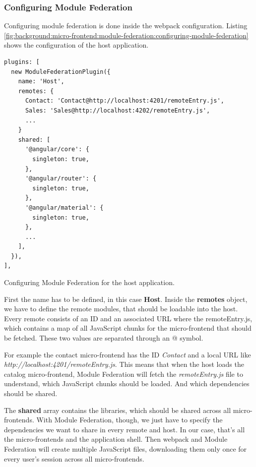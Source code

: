 \subsubsection{Configuring Module Federation}\label{subsubsection:background:micro-frontend:module-federation:configuring-module-federation}

Configuring module federation is done inside the webpack configuration. Listing \ref{fig:background:micro-frontend:module-federation:configuring-module-federation} shows the configuration of the host application.

\ifshowListings
\begin{listing}[H]
    \begin{verbatim}
plugins: [
  new ModuleFederationPlugin({
    name: 'Host',
    remotes: {
      Contact: 'Contact@http://localhost:4201/remoteEntry.js',
      Sales: 'Sales@http://localhost:4202/remoteEntry.js',
      ...
    }
    shared: [
      '@angular/core': {
        singleton: true,
      },
      '@angular/router': {
        singleton: true,
      },
      '@angular/material': {
        singleton: true,
      },
      ...
    ],
  }),
],
    \end{verbatim}
    \caption{Configuring Module Federation for the host application.}\label{fig:background:micro-frontend:module-federation:configuring-module-federation}
\end{listing}
\fi

\noindent First the name has to be defined, in this case \textbf{Host}. Inside the \textbf{remotes} object, we have to define the remote modules, that should be loadable into the host. Every remote consists of an ID and an associated URL where the remoteEntry.js, which contains a map of all JavaScript chunks for the micro-frontend that should be fetched. These two values are separated through an @ symbol. \cite[124]{book:2021:mezzalira:applied-methods:building-micro-frontends}

\noindent For example the contact micro-frontend has the ID \textit{Contact} and a local URL like \textit{http:\slash \slash localhost:4201\slash remoteEntry.js}. This means that when the host loads the catalog micro-frontend, Module Federation will fetch the \textit{remoteEntry.js} file to understand, which JavaScript chunks should be loaded. And which dependencies should be shared. \cite[125]{book:2021:mezzalira:applied-methods:building-micro-frontends}

\noindent The \textbf{shared} array contains the libraries, which should be shared across all micro-frontends. With Module Federation, though, we just have to specify the dependencies we want to share in every remote and host. In our case, that's all the micro-frontends and the application shell. Then webpack and Module Federation will create multiple JavaScript files, downloading them only once for every user's session across all micro-frontends. \cite[125]{book:2021:mezzalira:applied-methods:building-micro-frontends}

